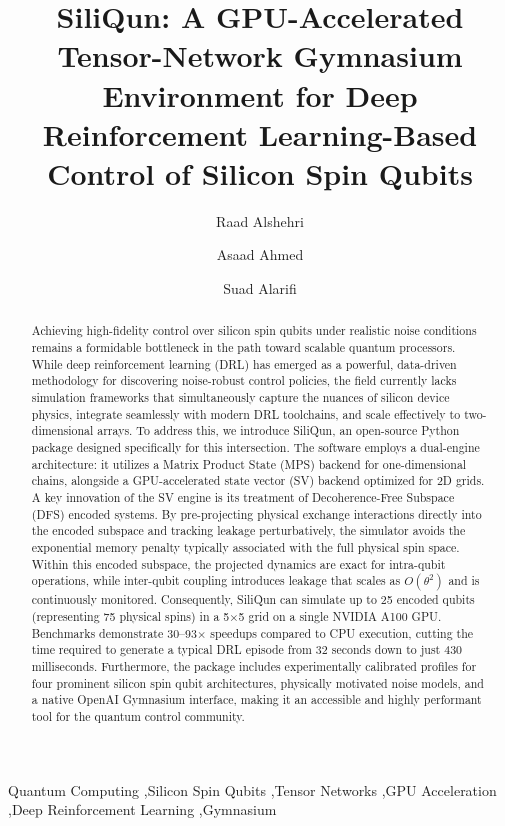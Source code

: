\documentclass[preprint,12pt, a4paper]{elsarticle}
\begin{document}
\renewcommand{\labelenumii}{\arabic{enumi}.\arabic{enumii}}

\begin{frontmatter}

\title{SiliQun: A GPU-Accelerated Tensor-Network Gymnasium Environment for Deep Reinforcement Learning-Based Control of Silicon Spin Qubits}

\author[label1]{Raad Alshehri}
\author[label1]{Asaad Ahmed}
\author[label1]{Suad Alarifi}
\address[label1]{Faculty of Computing and Information Technology, King Abdulaziz University, Jeddah 21589, Saudi Arabia}

\begin{abstract}
Achieving high-fidelity control over silicon spin qubits under realistic noise conditions remains a formidable bottleneck in the path toward scalable quantum processors. While deep reinforcement learning (DRL) has emerged as a powerful, data-driven methodology for discovering noise-robust control policies, the field currently lacks simulation frameworks that simultaneously capture the nuances of silicon device physics, integrate seamlessly with modern DRL toolchains, and scale effectively to two-dimensional arrays. To address this, we introduce SiliQun, an open-source Python package designed specifically for this intersection. The software employs a dual-engine architecture: it utilizes a Matrix Product State (MPS) backend for one-dimensional chains, alongside a GPU-accelerated state vector (SV) backend optimized for 2D grids. A key innovation of the SV engine is its treatment of Decoherence-Free Subspace (DFS) encoded systems. By pre-projecting physical exchange interactions directly into the encoded subspace and tracking leakage perturbatively, the simulator avoids the exponential memory penalty typically associated with the full physical spin space. Within this encoded subspace, the projected dynamics are exact for intra-qubit operations, while inter-qubit coupling introduces leakage that scales as $O(\theta^2)$ and is continuously monitored. Consequently, SiliQun can simulate up to 25 encoded qubits (representing 75 physical spins) in a 5$\times$5 grid on a single NVIDIA A100 GPU. Benchmarks demonstrate 30--93$\times$ speedups compared to CPU execution, cutting the time required to generate a typical DRL episode from 32 seconds down to just 430 milliseconds. Furthermore, the package includes experimentally calibrated profiles for four prominent silicon spin qubit architectures, physically motivated noise models, and a native OpenAI Gymnasium interface, making it an accessible and highly performant tool for the quantum control community.
\end{abstract}

\begin{keyword}
Quantum Computing \sep Silicon Spin Qubits \sep Tensor Networks \sep GPU Acceleration \sep Deep Reinforcement Learning \sep Gymnasium
\end{keyword}

\end{frontmatter}
\end{document}
